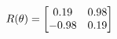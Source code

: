 \documentclass[preview]{standalone}
\begin{document}
\begin{align*}
\special{dvisvgm:raw <g id='unique000'>}R(\theta) = \begin{bmatrix}0.19 & 0.98\\-0.98 & 0.19\end{bmatrix}\special{dvisvgm:raw </g>}
\end{align*}
\end{document}
